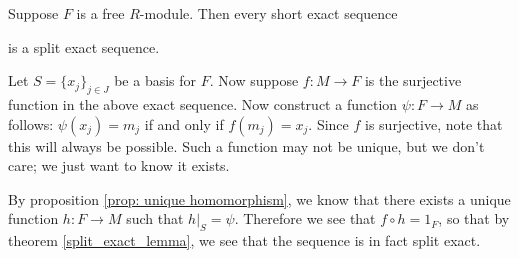\begin{proposition}
    Suppose $F$ is a free $R$-module. Then every short exact
    sequence 
    \begin{center}
    \end{center}
    is a split exact sequence. 
\end{proposition}

\begin{prf}
    Let $S = \{x_j\}_{j \in J}$ be a basis for $F$. Now suppose $f: M \to F$ is the
    surjective function in the above exact sequence. Now construct
    a function $\psi: F \to M$ as follows: $\psi(x_j) = m_j$ if
    and only if $f(m_j) = x_j$. Since $f$ is surjective, note that
    this will always be possible. Such a function may not be
    unique, but we don't care; we just want to know it exists. 

    By proposition \ref{prop: unique homomorphism}, we know that
    there exists a unique function $h: F \to M$ such that $h|_S =
    \psi$. Therefore we see that $f \circ h = 1_F$, so that by
    theorem \ref{split_exact_lemma}, we see that the sequence is
    in fact split exact. 
\end{prf}
